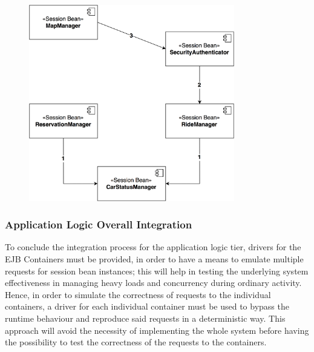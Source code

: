 \begin{figure}[H]
\begin{center}
		\includegraphics[width=0.8\textwidth]{./integration_strategy/diagrams/ride_reservation.png}
\end{center}
\end{figure}

\subsubsection{Application Logic Overall Integration}
To conclude the integration process for the application logic tier, drivers for the EJB Containers must be provided, in order to have a means to emulate multiple requests for session bean instances; this will help in testing the underlying system effectiveness in managing heavy loads and concurrency during ordinary activity.
\noindent
Hence, in order to simulate the correctness of requests to the individual containers, a driver for each individual container must be used to bypass the runtime behaviour and reproduce said requests in a deterministic way. This approach will avoid the necessity of implementing the whole system before having the possibility to test the correctness of the requests to the containers.

